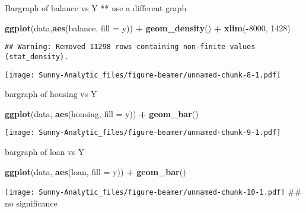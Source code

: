 \documentclass[ignorenonframetext,]{beamer}
\newenvironment{Shaded}{\begin{snugshade}}{\end{snugshade}}
\newcommand{\DataTypeTok}[1]{\textcolor[rgb]{0.13,0.29,0.53}{#1}}
\newcommand{\DecValTok}[1]{\textcolor[rgb]{0.00,0.00,0.81}{#1}}
\newcommand{\KeywordTok}[1]{\textcolor[rgb]{0.13,0.29,0.53}{\textbf{#1}}}
\newcommand{\NormalTok}[1]{#1}
\newcommand{\OperatorTok}[1]{\textcolor[rgb]{0.81,0.36,0.00}{\textbf{#1}}}
\newcommand{\StringTok}[1]{\textcolor[rgb]{0.31,0.60,0.02}{#1}}
\begin{document}
\begin{frame}[fragile]{Bargraph of balance vs Y ** use a different
graph}
\protect\hypertarget{bargraph-of-balance-vs-y-use-a-different-graph}{}

\begin{Shaded}
\begin{Highlighting}[]
\KeywordTok{ggplot}\NormalTok{(data,}\KeywordTok{aes}\NormalTok{(balance, }\DataTypeTok{fill =}\NormalTok{ y)) }\OperatorTok{+}\StringTok{ }\KeywordTok{geom_density}\NormalTok{() }\OperatorTok{+}\StringTok{ }\KeywordTok{xlim}\NormalTok{(}\OperatorTok{-}\DecValTok{8000}\NormalTok{, }\DecValTok{1428}\NormalTok{)}
\end{Highlighting}
\end{Shaded}

\begin{verbatim}
## Warning: Removed 11298 rows containing non-finite values (stat_density).
\end{verbatim}

\texttt{[image: Sunny-Analytic\_files/figure-beamer/unnamed-chunk-8-1.pdf]}

\end{frame}

\begin{frame}[fragile]{bargraph of housing vs Y}
\protect\hypertarget{bargraph-of-housing-vs-y}{}

\begin{Shaded}
\begin{Highlighting}[]
\KeywordTok{ggplot}\NormalTok{(data, }\KeywordTok{aes}\NormalTok{(housing, }\DataTypeTok{fill =}\NormalTok{ y)) }\OperatorTok{+}\StringTok{ }\KeywordTok{geom_bar}\NormalTok{()}
\end{Highlighting}
\end{Shaded}

\texttt{[image: Sunny-Analytic\_files/figure-beamer/unnamed-chunk-9-1.pdf]}

\end{frame}

\begin{frame}[fragile]{bargraph of loan vs Y}
\protect\hypertarget{bargraph-of-loan-vs-y}{}

\begin{Shaded}
\begin{Highlighting}[]
\KeywordTok{ggplot}\NormalTok{(data, }\KeywordTok{aes}\NormalTok{(loan, }\DataTypeTok{fill =}\NormalTok{ y)) }\OperatorTok{+}\StringTok{ }\KeywordTok{geom_bar}\NormalTok{()}
\end{Highlighting}
\end{Shaded}

\texttt{[image: Sunny-Analytic\_files/figure-beamer/unnamed-chunk-10-1.pdf]}
\#\# no significance

\end{frame}
\end{document}
